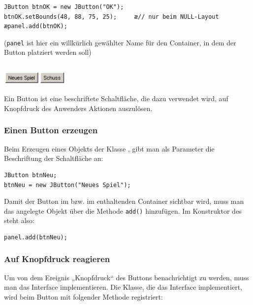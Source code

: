 \begin{lstlisting}
JButton btnOK = new JButton("OK"); 
btnOK.setBounds(48, 88, 75, 25);     æ// nur beim NULL-Layout
æpanel.add(btnOK);
\end{lstlisting}

(\lstinline|panel| ist hier ein willkürlich gewählter Name für den Container, in
dem der Button platziert werden soll)

\begin{minipage}{0.2\textwidth}
\subsection{}
\end{minipage}
\begin{minipage}{0.8\textwidth}
\includegraphics[width=0.25\textwidth]{./inf/SEKII/24_Java_GUI-Komponenten/JButton.png}
\end{minipage}

Ein Button ist eine beschriftete Schaltfläche, die dazu verwendet wird, auf
Knopfdruck des Anwenders Aktionen auszulösen.

\subsubsection{Einen Button erzeugen}

Beim Erzeugen eines Objekts der Klasse , gibt man als Parameter
die Beschriftung der Schaltfläche an:

\begin{lstlisting}
JButton btnNeu;
btnNeu = new JButton("Neues Spiel");
\end{lstlisting}

Damit der Button im  bzw. im enthaltenden Container sichtbar
wird, muss man das angelegte Objekt über die Methode \lstinline|add()|
hinzufügen. Im Konstruktor des  steht also:

\begin{lstlisting}
panel.add(btnNeu);
\end{lstlisting}

\subsubsection{Auf Knopfdruck reagieren}

Um von dem Ereignis „Knopfdruck“ des Buttons benachrichtigt zu werden, muss man
das Interface  implementieren. Die Klasse, die das
Interface implementiert, wird beim Button mit folgender Methode registriert:

